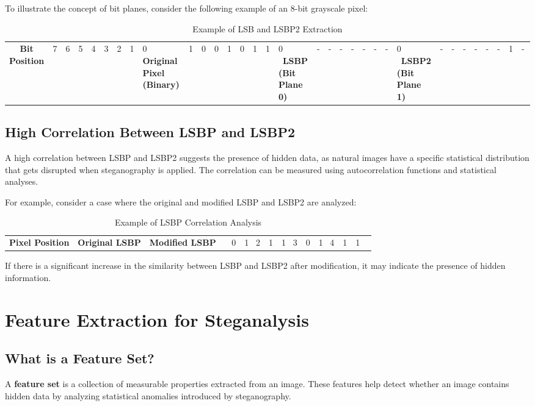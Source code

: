 \documentclass{article}
\begin{document}
To illustrate the concept of bit planes, consider the following example of an 8-bit grayscale pixel:

\begin{table}[h]
\centering
\begin{tabular}{cccccccc}
\toprule
\textbf{Bit Position} & 7 & 6 & 5 & 4 & 3 & 2 & 1 & 0 \
\midrule
\textbf{Original Pixel (Binary)} & 1 & 0 & 0 & 1 & 0 & 1 & 1 & 0 \
\textbf{LSBP (Bit Plane 0)} & - & - & - & - & - & - & - & 0 \
\textbf{LSBP2 (Bit Plane 1)} & - & - & - & - & - & - & 1 & - \
\bottomrule
\end{tabular}
\caption{Example of LSB and LSBP2 Extraction}
\label{tab:bit_planes}
\end{table}

\subsection{High Correlation Between LSBP and LSBP2}
A high correlation between LSBP and LSBP2 suggests the presence of hidden data, as natural images have a specific statistical distribution that gets disrupted when steganography is applied. The correlation can be measured using autocorrelation functions and statistical analyses.

For example, consider a case where the original and modified LSBP and LSBP2 are analyzed:

\begin{table}[h]
\centering
\begin{tabular}{ccc}
\toprule
\textbf{Pixel Position} & \textbf{Original LSBP} & \textbf{Modified LSBP} \
\midrule
1 & 0 & 1 \
2 & 1 & 1 \
3 & 0 & 1 \
4 & 1 & 1 \
\bottomrule
\end{tabular}
\caption{Example of LSBP Correlation Analysis}
\label{tab:lsbp_correlation}
\end{table}

If there is a significant increase in the similarity between LSBP and LSBP2 after modification, it may indicate the presence of hidden information.

\section{Feature Extraction for Steganalysis}

\subsection{What is a Feature Set?}
A \textbf{feature set} is a collection of measurable properties extracted from an image. These features help detect whether an image contains hidden data by analyzing statistical anomalies introduced by steganography.
\end{document}
